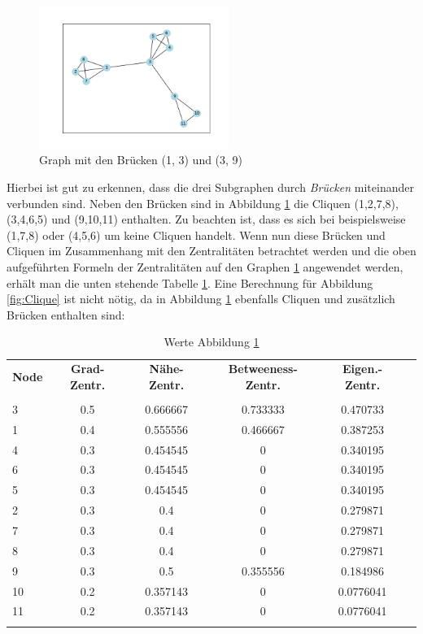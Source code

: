 \FloatBarrier
\begin{figure}[htb!]
    \centering
    \includegraphics[width=0.55\textwidth]{Graphics/Bridge.png}
    \caption{Graph mit den Brücken (1, 3) und (3, 9)}
    \label{fig:Bridge}
\end{figure}
Hierbei ist gut zu erkennen, dass die drei Subgraphen durch \textit{Brücken} miteinander verbunden sind. Neben den Brücken sind in Abbildung \ref{fig:Bridge} die Cliquen (1,2,7,8), (3,4,6,5) und (9,10,11) enthalten. Zu beachten ist, dass es sich bei beispielsweise (1,7,8) oder (4,5,6) um keine Cliquen handelt. Wenn nun diese Brücken und Cliquen im Zusammenhang mit den Zentralitäten betrachtet werden und die oben aufgeführten Formeln der Zentralitäten auf den Graphen \ref{fig:Bridge} angewendet werden, erhält man die unten stehende Tabelle \ref{table:TableCliqueBridg}. Eine Berechnung für Abbildung \ref{fig:Clique} ist nicht nötig, da in Abbildung \ref{fig:Bridge} ebenfalls Cliquen und zusätzlich Brücken enthalten sind:
\begin{table}[h!]
\centering
\footnotesize
\caption{Werte Abbildung \ref{fig:Bridge}}
\label{table:TableCliqueBridg}
\begin{tabular}{lccccc}\toprule
\textbf{Node} & \textbf{Grad-Zentr.} &\textbf{Nähe-Zentr.} &\textbf{Betweeness-Zentr.} & \textbf{Eigen.-Zentr.} \\
 &\\\midrule
  3 & 0.5 & 0.666667 & 0.733333 & 0.470733  \\
  1 & 0.4 & 0.555556 & 0.466667 & 0.387253  \\
  4 & 0.3 & 0.454545 & 0        & 0.340195  \\
  6 & 0.3 & 0.454545 & 0        & 0.340195  \\
  5 & 0.3 & 0.454545 & 0        & 0.340195  \\
  2 & 0.3 & 0.4      & 0        & 0.279871  \\
  7 & 0.3 & 0.4      & 0        & 0.279871  \\
  8 & 0.3 & 0.4      & 0        & 0.279871  \\
  9 & 0.3 & 0.5      & 0.355556 & 0.184986  \\
 10 & 0.2 & 0.357143 & 0        & 0.0776041 \\
 11 & 0.2 & 0.357143 & 0        & 0.0776041 \\
       
  \\\bottomrule
 \end{tabular}
 \end{table}

